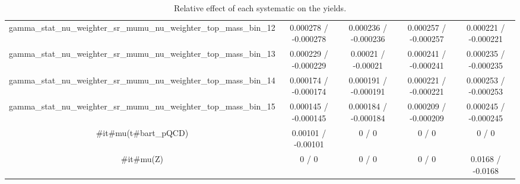\documentclass[10pt]{article}
\begin{document}
\begin{table}[htbp]
\begin{center}
\begin{tabular}{|c|c|c|c|c|}
  gamma_stat_nu_weighter_sr_mumu_nu_weighter_top_mass_bin_12 & 0.000278 / -0.000278 & 0.000236 / -0.000236 & 0.000257 / -0.000257 & 0.000221 / -0.000221 \\ 
  gamma_stat_nu_weighter_sr_mumu_nu_weighter_top_mass_bin_13 & 0.000229 / -0.000229 & 0.00021 / -0.00021 & 0.000241 / -0.000241 & 0.000235 / -0.000235 \\ 
  gamma_stat_nu_weighter_sr_mumu_nu_weighter_top_mass_bin_14 & 0.000174 / -0.000174 & 0.000191 / -0.000191 & 0.000221 / -0.000221 & 0.000253 / -0.000253 \\ 
  gamma_stat_nu_weighter_sr_mumu_nu_weighter_top_mass_bin_15 & 0.000145 / -0.000145 & 0.000184 / -0.000184 & 0.000209 / -0.000209 & 0.000245 / -0.000245 \\ 
  #it{#mu}(t#bar{t}_{pQCD}) & 0.00101 / -0.00101 & 0 / 0 & 0 / 0 & 0 / 0 \\ 
  #it{#mu}(Z) & 0 / 0 & 0 / 0 & 0 / 0 & 0.0168 / -0.0168 \\ 
\hline 
\end{tabular} 
\caption{Relative effect of each systematic on the yields.} 
\end{center} 
\end{table} 
\end{document}
